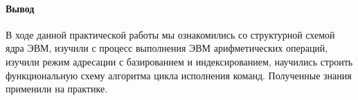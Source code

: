 \documentclass[a4paper,14pt]{extarticle}
\begin{document}
	\paragraph{Вывод}
	В ходе данной практической работы мы ознакомились со структурной схемой ядра ЭВМ, изучили с процесс выполнения ЭВМ арифметических операций, изучили режим адресации с базированием и индексированием, научились строить функциональную схему алгоритма цикла исполнения команд. Полученные знания применили на практике.
	
	
\end{document}
